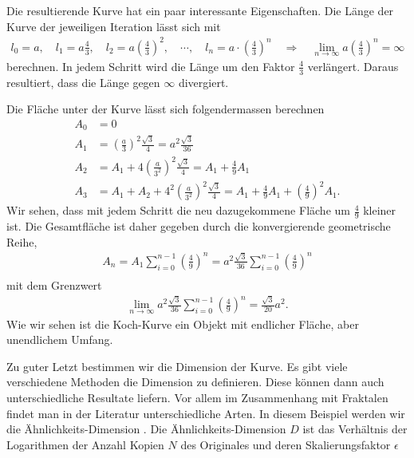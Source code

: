 Die resultierende Kurve hat ein paar interessante Eigenschaften.
Die Länge der Kurve der jeweiligen Iteration lässt sich mit 
\begin{align*}
	l_0 = a ,\quad l_1 = a  \frac{4}{3} ,\quad l_2 = a  \left( \frac{4}{3}\right)^2 , \quad \cdots , \quad
	l_n = a \cdot \left( \frac{4}{3}\right)^n \quad
	\Rightarrow \quad
	\lim_{n\to\infty} a  \left( \frac{4}{3}\right)^n = \infty
\end{align*}
berechnen.
In jedem Schritt wird die Länge um den Faktor $\frac{4}{3}$ verlängert. Daraus resultiert, dass die Länge gegen $\infty$ divergiert. 


Die Fläche unter der Kurve lässt sich folgendermassen berechnen
\begin{align*}
	A_0 &= 0 \\
	A_1 &= \left( \frac{a}{3}\right)^2 \frac{\sqrt{3}}{4} = a^2 \frac{\sqrt{3}}{36}\\
	A_2 &= A_1 + 4\left( \frac{a}{3^2}\right)^2 \frac{\sqrt{3}}{4} = A_1 + \frac{4}{9} A_1 \\ 
	A_3 &= A_1 + A_2 + 4^2 \left( \frac{a}{3^2}\right)^2 \frac{\sqrt{3}}{4} = A_1 + \frac{4}{9} A_1 + \left( \frac{4}{9}\right)^2 A_1.
\end{align*}
Wir sehen, dass mit jedem Schritt die neu dazugekommene Fläche um $\frac{4}{9}$ kleiner ist.
Die Gesamtfläche ist daher gegeben durch die konvergierende geometrische Reihe,
\begin{align*}
	A_n = A_1 \sum_{i = 0}^{n-1} \left( \frac{4}{9}\right)^n =  a^2 \frac{\sqrt{3}}{36} \sum_{i = 0}^{n-1} \left( \frac{4}{9}\right)^n \\
\end{align*}
mit dem Grenzwert
\begin{align*}
	\lim_{n\to\infty} a^2 \frac{\sqrt{3}}{36} \sum_{i = 0}^{n-1} \left( \frac{4}{9}\right)^n = \frac{\sqrt{3}}{20} a^2. 
\end{align*}
Wie wir sehen ist die Koch-Kurve ein Objekt mit endlicher Fläche, aber unendlichem Umfang.


Zu guter Letzt bestimmen wir die Dimension der Kurve. 
Es gibt viele verschiedene Methoden die Dimension zu definieren. Diese können dann auch unterschiedliche Resultate liefern.
Vor allem im Zusammenhang mit Fraktalen findet man in der Literatur unterschiedliche Arten.
In diesem Beispiel werden wir die Ähnlichkeits-Dimension \cite{ifs:fractal-geometry}.
Die Ähnlichkeits-Dimension $D$ ist das Verhältnis der Logarithmen der Anzahl Kopien $N$ des Originales und deren Skalierungsfaktor $\epsilon$
  
